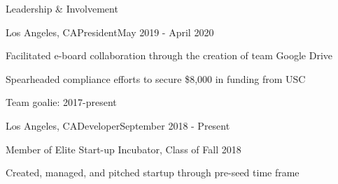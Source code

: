 \documentclass{resume} %
\begin{document}
\begin{rSection}{Leadership \& Involvement}

\begin{rSubsection}{\uscih}{Los Angeles, CA}{President}{May 2019 -
    April 2020}
\item Facilitated e-board collaboration through the creation of team Google Drive
\item Spearheaded compliance efforts to secure \$8,000 in funding from USC
\item Team goalie: 2017-present
\end{rSubsection}


\begin{rSubsection}{\lavalab}{Los Angeles, CA}{Developer}{September 2018 -
    Present}
\item Member of Elite Start-up Incubator, Class of Fall 2018
\item Created, managed, and pitched startup through pre-seed time frame
\end{rSubsection}

\end{rSection}

\end{document}
